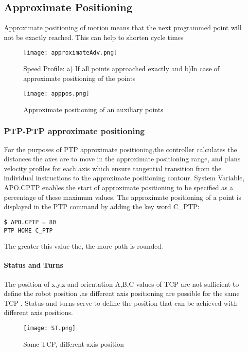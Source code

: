 \subsection{Approximate Positioning}
Approximate positioning of motion means that the next programmed point will not be exactly reached. This can help to shorten cycle times
 \begin{figure}[h]
	\centering
	\texttt{[image: approximateAdv.png]}
    \caption[Speed Profiles]{Speed Profile: a) If all points approached exactly and b)In  case of approximate positioning of the points}
\end{figure}
\begin{figure}[h]
	\centering
	\texttt{[image: apppos.png]}
    	\caption{Approximate positioning of an auxiliary points}
\end{figure}

\subsubsection{PTP-PTP approximate positioning }
For the purposes of PTP approximate positioning,the controller calculates the distances the axes are to move in the approximate positioning range, and plans velocity profiles for each axis which ensure tangential transition from the individual instructions to the approximate positioning contour.
\vspace{0.3cm} 
\newline System Variable, \textdollar APO.CPTP enables the start of approximate positioning to be specified as a percentage of these maximum values.
The approximate positioning of a point is displayed in the PTP command by adding the key word C\_PTP: 
\begin{lstlisting}[language=terCmd]
$ APO.CPTP = 80
PTP HOME C_PTP
\end{lstlisting}
The greater this value the, the more path is rounded.


\paragraph{Status and Turns}
The position of x,y,z and orientation A,B,C values of TCP are not sufficient to define the robot position ,as different axis positioning  are possible for the same TCP .
Status and turns serve to define the position that can be achieved with different axis positions.
\begin{figure}[h]
	\centering
	\texttt{[image: ST.png]}
    	\caption{Same TCP, different axis position}
\end{figure}
